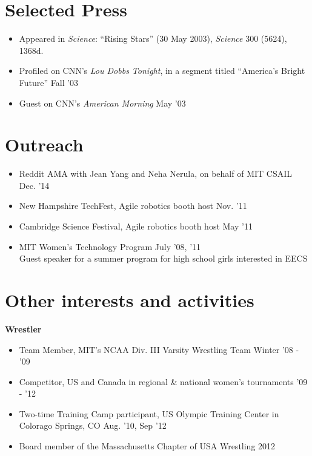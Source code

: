 \documentclass[margin]{res}
\begin{document}
\begin{resume}
\section{Selected Press}
\begin{itemize}[leftmargin=*] \itemsep -2pt
\item Appeared in \textit{Science}: ``Rising Stars'' (30 May 2003), \textit{Science} 300 (5624), 1368d.
\item Profiled on CNN's \textit{Lou Dobbs Tonight}, in a segment titled ``America's Bright Future''  \hfill Fall '03 
\item Guest on CNN's \textit{American Morning} \hfill May '03
\end{itemize}

\section{Outreach}
\begin{itemize}[leftmargin=*] \itemsep -2pt
\item Reddit AMA with Jean Yang and Neha Nerula, on behalf of MIT CSAIL \hfill Dec. '14
\item New Hampshire TechFest, Agile robotics booth host \hfill Nov. '11
\item Cambridge Science Festival, Agile robotics booth host \hfill May '11
\item MIT Women's Technology Program \hfill July '08, '11 \\
Guest speaker for a summer program for high school girls interested in EECS
\end{itemize}

\section{Other interests and activities}
{\bf Wrestler}
\begin{itemize}[leftmargin=*] \itemsep -2pt
\item Team Member, MIT's NCAA Div. III Varsity Wrestling Team \hfill Winter '08 - '09
\item Competitor, US and Canada in regional \& national women's tournaments \hfill '09 - '12
\item Two-time Training Camp participant, US Olympic Training Center in Colorago Springs, CO \hfill Aug. '10, Sep '12
\item Board member of the Massachusetts Chapter of USA Wrestling \hfill 2012


\end{itemize}

\end{resume} 
 
\end{document}
